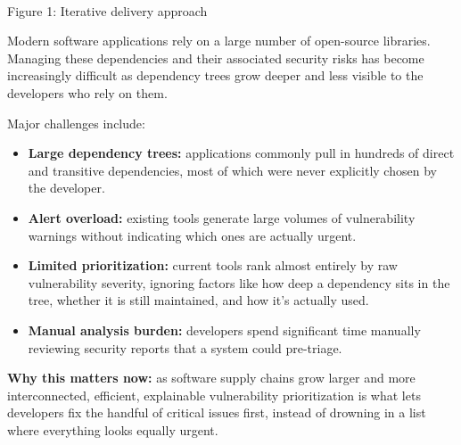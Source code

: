 \documentclass[11pt]{article}
\newcommand{\fstep}[4]{%
  \node[fnode, #2] (#1) {#4};%
  \node[fbadge] at (#1.north west) {#3};%
}
\newcommand{\propsectionplain}[2]{%
  \vspace{8pt}%
  \noindent{\Large\bfseries #1.\ #2}\par
  \vspace{2pt}%
}
\begin{document}
\begin{center}
\\[1pt]
{\scriptsize Figure 1: Iterative delivery approach}
\end{center}

\propsectionplain{3}{Problem Statement}

Modern software applications rely on a large number of open-source libraries. Managing these dependencies and their associated security risks has become increasingly difficult as dependency trees grow deeper and less visible to the developers who rely on them.

Major challenges include:

\begin{itemize}
  \item \textbf{Large dependency trees:} applications commonly pull in hundreds of direct and transitive dependencies, most of which were never explicitly chosen by the developer.
  \item \textbf{Alert overload:} existing tools generate large volumes of vulnerability warnings without indicating which ones are actually urgent.
  \item \textbf{Limited prioritization:} current tools rank almost entirely by raw vulnerability severity, ignoring factors like how deep a dependency sits in the tree, whether it is still maintained, and how it's actually used.
  \item \textbf{Manual analysis burden:} developers spend significant time manually reviewing security reports that a system could pre-triage.
\end{itemize}

\textbf{Why this matters now:} as software supply chains grow larger and more interconnected, efficient, explainable vulnerability prioritization is what lets developers fix the handful of critical issues first, instead of drowning in a list where everything looks equally urgent.
\end{document}
